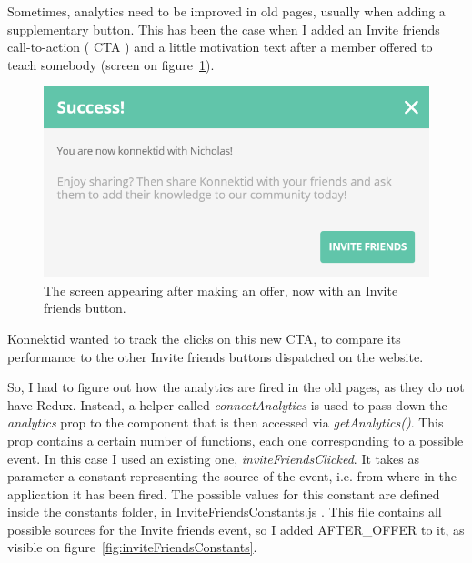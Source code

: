Sometimes, analytics need to be improved in old pages, usually when adding a supplementary button. This has been the case when I added an \guillemotleft{} Invite friends \guillemotright{} call-to-action (\guillemotleft{} CTA \guillemotright{}) and a little motivation text after a member offered to teach somebody (screen on {\sc figure}~\ref{fig:afterOffer}).

\begin{figure}[H]
    \centering
    \includegraphics[scale=0.8]{figure/afterOffer.png}
    \caption{The screen appearing after making an offer, now with an \guillemotleft{} Invite friends \guillemotright{} button.}
    \label{fig:afterOffer}
\end{figure}

Konnektid wanted to track the clicks on this new CTA, to compare its performance to the other \guillemotleft{} Invite friends \guillemotright{} buttons dispatched on the website. 

So, I had to figure out how the analytics are fired in the old pages, as they do not have Redux. Instead, a helper called \textit{connectAnalytics} is used to pass down the \textit{analytics} prop to the component that is then accessed via \textit{getAnalytics()}. This prop contains a certain number of functions, each one corresponding to a possible event. In this case I used an existing one, \textit{inviteFriendsClicked}. It takes as parameter a constant representing the source of the event, i.e. from where in the application it has been fired. The possible values for this constant are defined inside the \guillemotleft{} constants \guillemotright{} folder, in \guillemotleft{} InviteFriendsConstants.js \guillemotright{}. This file contains all possible sources for the \guillemotleft{} Invite friends \guillemotright{} event, so I added AFTER\_OFFER to it, as visible on {\sc figure}~\ref{fig:inviteFriendsConstants}.

